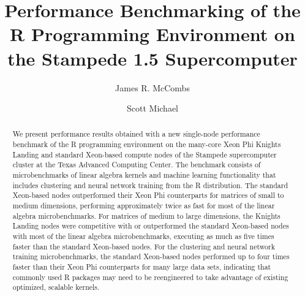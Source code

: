 \documentclass[sigconf]{acmart}
\begin{document}
\title[Perf. Benchmarking of the R Programming Env. on the Stampede 1.5 Supercomputer]{Performance Benchmarking of the R Programming Environment on the Stampede 1.5 Supercomputer}


\author{James R. McCombs}

\author{Scott Michael}

\renewcommand{\shortauthors}{J.R. McCombs et al.}


\begin{abstract}

We present performance results obtained with a new single-node
performance benchmark of the R programming environment on
the many-core Xeon Phi Knights Landing and standard Xeon-based
compute nodes of the Stampede supercomputer cluster at the Texas
Advanced Computing Center.  The benchmark consists of
microbenchmarks of linear algebra kernels and machine learning
functionality that includes clustering and neural network training
from the R distribution.  The standard Xeon-based nodes outperformed
their Xeon Phi counterparts for matrices of small to medium
dimensions, performing approximately twice as fast for most of the
linear algebra microbenchmarks.  For matrices of medium to large
dimensions, the Knights Landing nodes were
competitive with or outperformed the standard Xeon-based nodes with
most of the linear algebra microbenchmarks, executing as much as five
times faster than the standard Xeon-based nodes.  For the clustering and neural
network training microbenchmarks, the standard Xeon-based nodes
performed up to four times faster than their Xeon Phi counterparts
for many large data sets, indicating that commonly used R packages
may need to be reengineered to take advantage of existing optimized,
scalable kernels.

\end{abstract}
\end{document}
